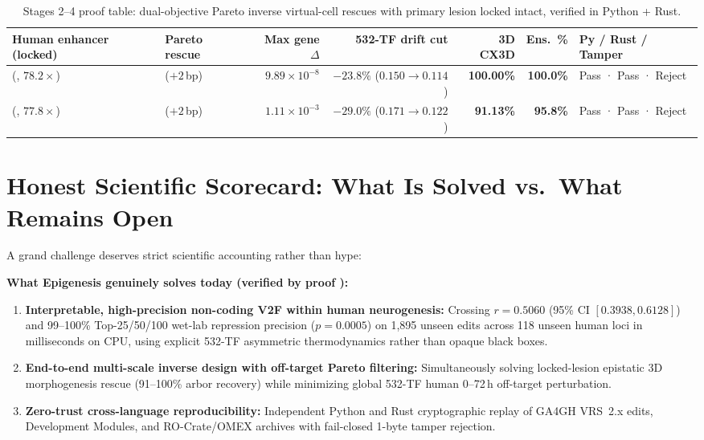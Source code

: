 \documentclass[10.5pt,a4paper]{article}
\begin{document}
\begin{table}[tb]
\scriptsize\setlength{\tabcolsep}{4pt}
\caption{Stages 2--4 proof table: dual-objective Pareto inverse virtual-cell rescues with primary lesion locked intact, verified in Python + Rust.}\label{tab:pareto}
\begin{tabular}{@{}L{30mm}L{19mm}r r r r L{21mm}@{}}
\toprule
Human enhancer (locked) & Pareto rescue & Max gene $\Delta$ & 532-TF drift cut & 3D CX3D & Ens.\ \% & Py / Rust / Tamper \\
\midrule
{} (, $78.2\times$) & \textbf{} ($+2$\,bp) & \textbf{$9.89\times10^{-8}$} & \textbf{$-23.8\%$} ($0.150\to 0.114$) & \textbf{100.00\%} & \textbf{100.0\%} & Pass · Pass · Reject \\
 (, $77.8\times$) & \textbf{} ($+2$\,bp) & $1.11\times10^{-3}$ & \textbf{$-29.0\%$} ($0.171\to 0.122$) & \textbf{91.13\%} & \textbf{95.8\%} & Pass · Pass · Reject \\
\bottomrule
\end{tabular}
\end{table}

\section{Honest Scientific Scorecard: What Is Solved vs.\ What Remains Open}

A grand challenge deserves strict scientific accounting rather than hype:

\textbf{What Epigenesis genuinely solves today (verified by proof ):}
\begin{enumerate}
\item \textbf{Interpretable, high-precision non-coding V2F within human neurogenesis:} Crossing $r=0.5060$ (95\% CI $[0.3938, 0.6128]$) and 99--100\% Top-25/50/100 wet-lab repression precision ($p=0.0005$) on 1,895 unseen edits across 118 unseen human loci in milliseconds on CPU, using explicit 532-TF asymmetric thermodynamics rather than opaque black boxes.
\item \textbf{End-to-end multi-scale inverse design with off-target Pareto filtering:} Simultaneously solving locked-lesion epistatic 3D morphogenesis rescue (91--100\% arbor recovery) while minimizing global 532-TF human 0--72\,h off-target perturbation.
\item \textbf{Zero-trust cross-language reproducibility:} Independent Python and Rust cryptographic replay of GA4GH VRS~2.x edits, Development Modules, and RO-Crate/OMEX archives with fail-closed 1-byte tamper rejection.
\end{enumerate}
\end{document}
